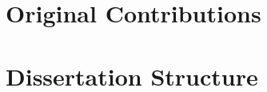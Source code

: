
\section{Original Contributions}
\label{sec:introduction-contributions}


\section{Dissertation Structure}
\label{sec:introduction-structure}

